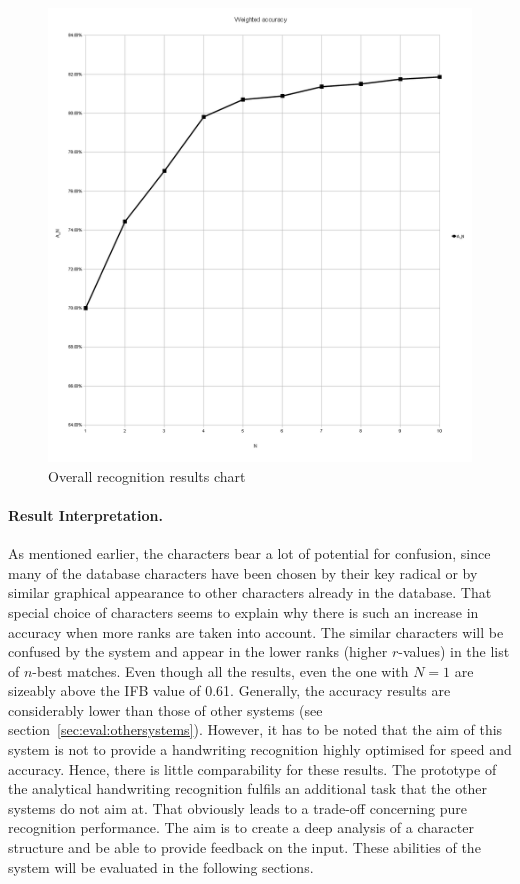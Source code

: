 \begin{figure}[htbp]
  \begin{center}
    \includegraphics[scale=0.5]{images/weightedAccuracyOverall.png}
    \caption{Overall recognition results chart}
    \label{fig:eval:overallrecognitionresults}
  \end{center}
\end{figure}

\paragraph{Result Interpretation.}
As mentioned earlier, the characters bear a lot of potential for confusion,
since many of the database characters have been chosen by their key radical
or by similar graphical appearance to other characters already in the database.
That special choice of characters seems to explain why there is such an
increase in accuracy when more ranks are taken into account.
The similar characters will be confused by the system and appear in
the lower ranks (higher \(r\)-values) in the list of \(n\)-best matches.
Even though all the results, even the one with \(N = 1\) are sizeably above
the IFB value of 0.61.
Generally, the accuracy results are considerably lower than those of other
systems (see section~\ref{sec:eval:othersystems}). 
However, it has to be noted that the aim of this system is not 
to provide a handwriting recognition highly optimised for speed and accuracy.
Hence, there is little comparability for these results. 
The prototype of the analytical handwriting recognition fulfils an additional 
task that the other systems do not aim at. That obviously leads to a trade-off
concerning pure recognition performance.
The aim is to create a deep analysis of a character structure and
be able to provide feedback on the input. These abilities of the system will
be evaluated in the following sections.

